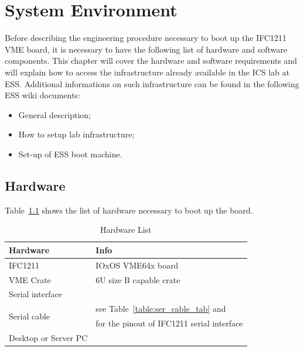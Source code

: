 \documentclass[11pt
  , a4paper
  , article
  , oneside
  , showtrims
]{memoir}
\begin{document}


\clearpage

\chapter{System Environment}
Before describing the engineering procedure necessary to boot up the IFC1211 VME board, it is necessary to have the following list of hardware and software components. This chapter will cover the hardware and software requirements and will explain how to access the infrastructure already available in the ICS lab at ESS. Additional informations on such infrastructure can be found in the following ESS wiki documents:
\begin{itemize}
	\item  General description\cite{GDLI};
	\item  How to setup lab infrastructure\cite{SULI};
	\item  Set-up of ESS boot machine\cite{SETUP_LAB_INFRASTRUCTURE}.
\end{itemize}

\section{Hardware}
Table~\ref{table:hwlist} shows the list of hardware necessary to boot up the board. 

\begin{table}[!hb]
	\centering
	\begin{tabular}{l|l}
		\toprule
		\bfseries{Hardware}       & \bfseries{Info}                  \\\midrule
		IFC1211                   & IOxOS VME64x board               \\\midrule
		VME Crate                 & 6U size B capable crate          \\\midrule
		Serial interface          &                                  \\\midrule
		\multicolumn{1}{l|}{\multirow{2}{*}{Serial cable}} & see Table~\ref{table:ser_cable_tab} and \cite{IFC1211_HW_TUG}\\
		                          & for the pinout of IFC1211 serial interface   \\\midrule
		Desktop or Server PC      &                                  \\\bottomrule
	\end{tabular}
	\caption[]{Hardware List}
	\label{table:hwlist}
\end{table}
\end{document}
